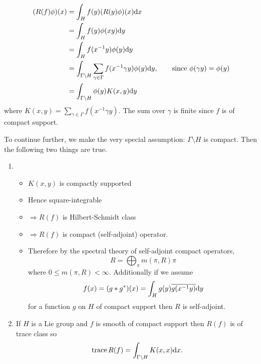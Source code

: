 \documentclass[11pt]{amsart}
\def\cb#1{{\color{blue}#1}}
\def\d{\text d}
\def\bs{\setminus} 			%
\def\trace{\operatorname{trace}}
\theoremstyle{remark}
\begin{document}
\begin{align*}
	(R(f)\phi)(x) & = \int_H f(y) (R(y)\phi)(x) \d x \\
			& = \int_H f(y) \phi(xy) \d y \\
			& = \int_H f(x^{-1} y) \phi(y) \d y \\
			& = \int_{\Gamma\bs H} \sum_{\gamma \in \Gamma} f(x^{-1}\gamma y) \phi(y) \d y, \qquad \text{since } \phi(\gamma y) = \phi(y)\\
			& = \int_{\Gamma\bs H} \phi(y) K(x, y) \d y
\end{align*}
where $K(x, y) = \sum_{\gamma \in \Gamma} f(x^{-1}\gamma y)$. The sum over $\gamma$ is finite since $f$ is of compact support. 

To continue further, we make the very special assumption: \cb{$\Gamma\bs H$ is compact.} Then the following two things are true. 
\begin{enumerate}
\item 	\begin{itemize}
		\item[] $K(x, y)$ is compactly supported 
		\item[] Hence square-integrable
		\item[] $\Rightarrow R(f)$ is Hilbert-Schmidt class
		\item[] $\Rightarrow R(f)$ is compact (self-adjoint) operator. 
		\item[] Therefore by the spectral theory of self-adjoint compact operators,
			\[ \boxed{ R = \bigoplus_\pi m(\pi, R) \pi } \]
			where $0 \leq m(\pi, R) < \infty$. Additionally if we assume 
			\[ f(x) = (g*g^*)(x) = \int_H g(y) \overline{g(x^{-1}y)} \d y\]
			for a function $g$ on $H$ of compact support then $R$ is self-adjoint. 
		\end{itemize}

\item If $H$ is a Lie group and $f$ is smooth of compact support then $R(f)$ is of trace class so
	\[ \trace R(f) = \int_{\Gamma\bs H} K(x, x) \d x. \]
\end{enumerate}
\end{document}
